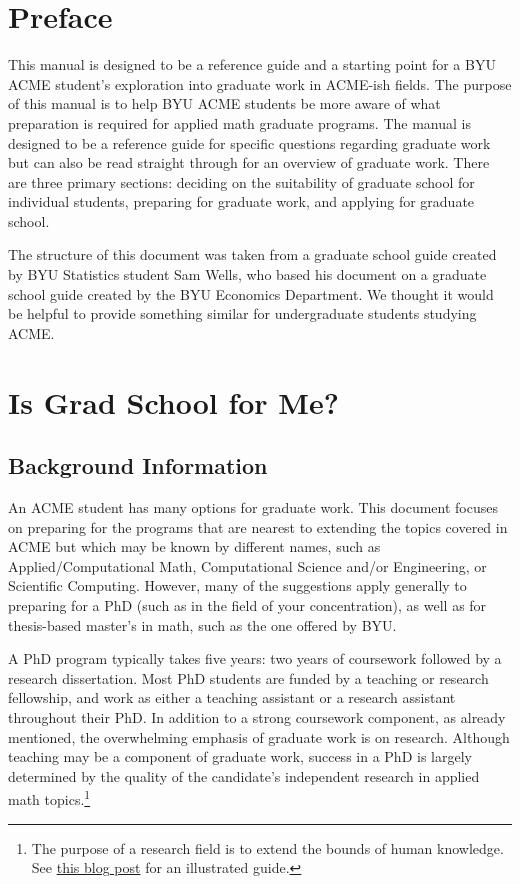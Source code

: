 \documentclass[11pt]{article}
\begin{document}
\section*{Preface}
This manual is designed to be a reference guide and a starting point for a BYU ACME student’s exploration into graduate work in ACME-ish fields. The purpose of this manual is to help BYU ACME students be more aware of what preparation is required for applied math graduate programs. The manual is designed to be a reference guide for specific questions regarding graduate work but can also be read straight through for an overview of graduate work. There are three primary sections: deciding on the suitability of graduate school for individual students, preparing for graduate work, and applying for graduate school.

The structure of this document was taken from a graduate school guide created by BYU Statistics student Sam Wells, who based his document on a graduate school guide created by the BYU Economics Department. We thought it would be helpful to provide something similar for undergraduate students studying ACME.

\newpage

\section{Is Grad School for Me?}
\subsection{Background Information}
An ACME student has many options for graduate work. This document focuses on preparing for the programs that are nearest to extending the topics covered in ACME but which may be known by different names, such as Applied/Computational Math, Computational Science and/or Engineering, or Scientific Computing. However, many of the suggestions apply generally to preparing for a PhD (such as in the field of your concentration), as well as for thesis-based master's in math, such as the one offered by BYU.  

A PhD program typically takes five years: two years of coursework followed by a research dissertation. Most PhD students are funded by a teaching or research fellowship, and work as either a teaching assistant or a research assistant throughout their PhD. In addition to a strong coursework component, as already mentioned, the overwhelming emphasis of graduate work is on research. Although teaching may be a component of graduate work, success in a PhD is largely determined by the quality of the candidate's independent research in applied math topics.\footnote{The purpose of a research field is to extend the bounds of human knowledge. See \href{https://matt.might.net/articles/phd-school-in-pictures/}{this blog post} for an illustrated guide.}
\end{document}
